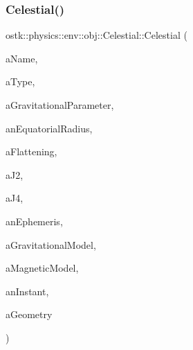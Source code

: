 \subsubsection{\texorpdfstring{Celestial()}{Celestial()}\hspace{0.1cm}{\footnotesize\ttfamily [2/2]}}
{\footnotesize\ttfamily ostk\+::physics\+::env\+::obj\+::\+Celestial\+::\+Celestial (\begin{DoxyParamCaption}\item[{const String \&}]{a\+Name,  }\item[{const \hyperlink{classostk_1_1physics_1_1env_1_1obj_1_1_celestial_aa0711d887522b35b2b3630156d912779}{Celestial\+::\+Type} \&}]{a\+Type,  }\item[{const \hyperlink{classostk_1_1physics_1_1units_1_1_derived}{Derived} \&}]{a\+Gravitational\+Parameter,  }\item[{const \hyperlink{classostk_1_1physics_1_1units_1_1_length}{Length} \&}]{an\+Equatorial\+Radius,  }\item[{const Real \&}]{a\+Flattening,  }\item[{const Real \&}]{a\+J2,  }\item[{const Real \&}]{a\+J4,  }\item[{const Shared$<$ \hyperlink{classostk_1_1physics_1_1env_1_1_ephemeris}{Ephemeris} $>$ \&}]{an\+Ephemeris,  }\item[{const Shared$<$ \hyperlink{namespaceostk_1_1physics_1_1env_1_1obj_a50c0bc72e8880f2fa2a910a81e050c97}{Gravitational\+Model} $>$ \&}]{a\+Gravitational\+Model,  }\item[{const Shared$<$ \hyperlink{namespaceostk_1_1physics_1_1env_1_1obj_a11552c1290e2f6b4693ea00c2df2c80d}{Magnetic\+Model} $>$ \&}]{a\+Magnetic\+Model,  }\item[{const \hyperlink{classostk_1_1physics_1_1time_1_1_instant}{Instant} \&}]{an\+Instant,  }\item[{const \hyperlink{classostk_1_1physics_1_1env_1_1_object_a66e44a65aefb23a184a6de531e96935d}{Object\+::\+Geometry} \&}]{a\+Geometry }\end{DoxyParamCaption})}

\mbox{\label{classostk_1_1physics_1_1env_1_1obj_1_1_celestial_aadbeb101aaa4c4acb136278385d2080b}} 
